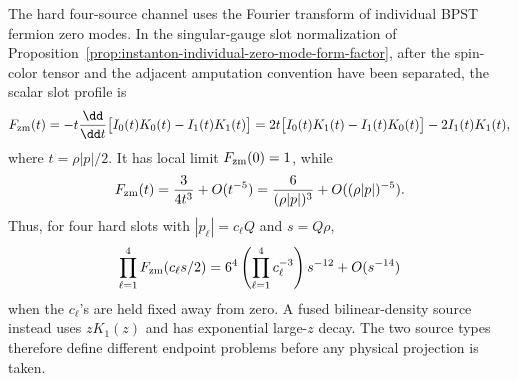 \begin{proposition}
\label{prop:instanton-hard-individual-zero-mode-slot}
The hard four-source channel uses the Fourier transform of individual BPST
fermion zero modes.  In the singular-gauge slot normalization of
Proposition~\ref{prop:instanton-individual-zero-mode-form-factor}, after the
spin-color tensor and the adjacent amputation convention have been separated,
the scalar slot profile is
\begin{equation}
  F_{\rm zm}(t)
  =
  -t\frac{\dd}{\dd t}
  \bigl[I_0(t)K_0(t)-I_1(t)K_1(t)\bigr]
  =
  2t\bigl[I_0(t)K_1(t)-I_1(t)K_0(t)\bigr]
  -2I_1(t)K_1(t),
  \label{eq:instanton-physical-individual-slot-form-factor}
\end{equation}
where \(t=\rho |p|/2\).  It has local limit \(F_{\rm zm}(0)=1\), while
\begin{equation}
  F_{\rm zm}(t)
  =
  \frac{3}{4t^3}+O(t^{-5})
  =
  \frac{6}{(\rho |p|)^3}
  +O((\rho |p|)^{-5}).
  \label{eq:instanton-physical-individual-slot-tail}
\end{equation}
Thus, for four hard slots with \(|p_\ell|=c_\ell Q\) and \(s=Q\rho\),
\begin{equation}
  \prod_{\ell=1}^4 F_{\rm zm}(c_\ell s/2)
  =
  6^4
  \left(\prod_{\ell=1}^4c_\ell^{-3}\right)
  s^{-12}
  +O(s^{-14})
  \label{eq:instanton-physical-four-slot-product-tail}
\end{equation}
when the \(c_\ell\)'s are held fixed away from zero.  A fused bilinear-density
source instead uses \(zK_1(z)\) and has exponential large-\(z\) decay.  The
two source types therefore define different endpoint problems before any
physical projection is taken.
\end{proposition}

